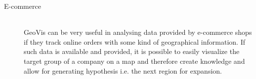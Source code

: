 \begin{description}
\item[E-commerce] \hfill \\
\ac{GeoVis} can be very useful in analysing data provided by e-commerce shops if they track online orders with some kind of geographical information. If such data is available and provided, it is possible to easily visualize the target group of a company on a map and therefore  create knowledge and allow for generating hypothesis i.e. the next region for expansion.

\end{description}